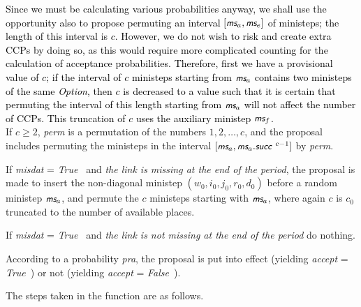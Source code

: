 \documentclass[a4paper,12pt,fleqn]{article}
\newcommand{\nnm}[1]{\textsf{\small\textit{#1}\ }}
\newcommand{\ms}{\textsl{\textsf{\small ms}}} %
\newcommand{\addce}[1]{{\textcolor[named]{Black}{#1}}}
\begin{document}
\addce{
Since we must be calculating various probabilities anyway, we shall
use the opportunity also to propose permuting an interval $[\ms_a, \ms_e]$
of ministeps; the length of this interval is $c$.
However, we do not wish to risk and create extra CCPs by doing so,
as this would require more complicated counting
for the calculation of acceptance probabilities.
Therefore, first we have a provisional value of $c$;
if the interval of $c$ ministeps starting from $\ms_a$ contains
two ministeps of the same \textit{Option}, then $c$ is decreased
to a value such that it is certain that permuting the interval
of this length starting from $\ms_a$ will not affect the
number of CCPs.
This truncation of $c$ uses the auxiliary ministep $\ms_f$.
}\\
If $c \geq 2$,
\textit{perm} is a permutation of the numbers $ 1, 2, \ldots, c$,
and the proposal includes permuting the ministeps in the interval
$[\ms_a, \ms_a.\nnm{succ}^{{c-1}}]$ by \textit{perm}.

If  \textit{misdat} = \nnm{True} and \emph{the link is missing at the end of the
period}, the proposal is made to insert the non-diagonal ministep
$(w_0,i_0,j_0,r_0,d_0)$ before
a random ministep $\ms_a$, and permute the $c$ ministeps starting with $\ms_a$,
where again $c$ is $c_0$ truncated to the number of available places.

If  \textit{misdat} = \nnm{True} and \emph{the link is not missing at the end of
  the period} do nothing.

According to a  probability \textit{pra},
the proposal is put into effect (yielding \textit{accept} = \nnm{True})
or not (yielding \textit{accept} = \nnm{False}).

The steps taken in the function are as follows.
\end{document}
